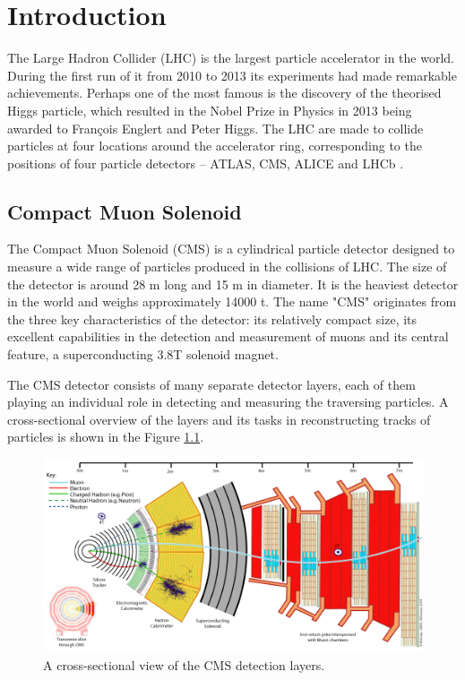 \chapter{Introduction}


The Large Hadron Collider (LHC) is the largest particle accelerator in the world. During the first run of it from 2010 to 2013 its experiments had made remarkable achievements. Perhaps one of the most famous is the discovery of the theorised Higgs particle, which resulted in the Nobel Prize in Physics in 2013 being awarded to François Englert and Peter Higgs. The LHC are made to collide particles at four locations around the accelerator ring, corresponding to the positions of four particle detectors – ATLAS, CMS, ALICE and LHCb \cite{ref_cern_home}.


\section{Compact Muon Solenoid}


The Compact Muon Solenoid (CMS) is a cylindrical particle detector designed to measure a wide range of particles produced in the collisions of LHC. The size of the detector is around 28 m long and 15 m in diameter. It is the heaviest detector in the world and weighs approximately 14000 t. The name "CMS" originates from the three key characteristics of the detector: its relatively compact size, its excellent capabilities in the detection and measurement of muons and its central feature, a superconducting 3.8T solenoid magnet.

The CMS detector consists of many separate detector layers, each of them playing an individual role in detecting and measuring the traversing particles. A cross-sectional overview of the layers and its tasks in reconstructing tracks of particles is shown in the Figure \ref{fig:cms_layers}.

\begin{figure}[ht]\centering
\includegraphics[width=0.9\linewidth]{Data/Introduction/CMS_layers.png}
\caption{A cross-sectional view of the CMS detection layers.}
\label{fig:cms_layers}
\end{figure}

